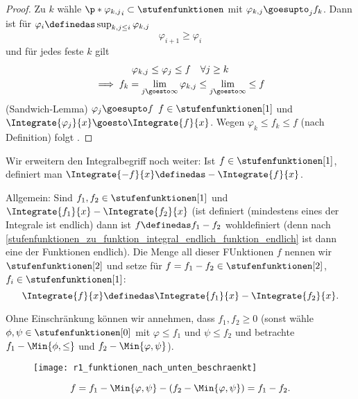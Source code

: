 \begin{proof}
  Zu \( k \) wähle \( \p*{\varphi_{k,j}}_i\subset \stufenfunktionen \) mit \( \varphi_{k,j}\goesupto_{j}f_k \). Dann ist für \( \varphi_i\definedas \sup_{k,j\leq i}\varphi_{k,j} \)
  \begin{equation*}
    \varphi_{i+1}\geq \varphi_i
  \end{equation*}
und für jedes feste \( k \) gilt
\begin{gather*}
  \varphi_{k,j}\leq \varphi_j\leq f \quad \forall j\geq k\\
  \implies f_k=\lim_{j \goesto \infty}\varphi_{k,j}\leq \lim_{j \goesto \infty}\leq f
\end{gather*}
\timplies (Sandwich-Lemma) \( \varphi_j\goesupto f \) \timplies \( f\in \stufenfunktionen[1] \) und \( \Integrate{\varphi_j}{x}\goesto \Integrate{f}{x} \). Wegen \( \varphi_k\leq f_k\leq f \) (nach Definition) folgt \Beh.
\end{proof}
\begin{bemdef}
  Wir erweitern den Integralbegriff noch weiter: Ist \( f\in \stufenfunktionen[1] \), definiert man \( \Integrate{-f}{x}\definedas -\Integrate{f}{x} \).

  Allgemein: Sind \( f_1,f_2\in \stufenfunktionen[1] \) und \( \Integrate{f_1}{x}-\Integrate{f_2}{x} \) (ist definiert (\dh mindestens eines der Integrale ist endlich) dann ist \( f\definedas f_1-f_2 \) wohldefiniert (denn nach \ref{stufenfunktionen_zu_funktion_integral_endlich_funktion_endlich} ist dann eine der Funktionen \fue endlich). Die Menge all dieser FUnktionen \( f \) nennen wir \( \stufenfunktionen[2] \) und setze für \( f=f_1-f_2\in \stufenfunktionen[2] \), \( f_i\in \stufenfunktionen[1] \):
  \begin{equation*}
    \Integrate{f}{x}\definedas \Integrate{f_1}{x}-\Integrate{f_2}{x}.
  \end{equation*}
\end{bemdef}
\begin{bemerkung*}
  Ohne Einschränkung können wir annehmen, dass \( f_1,f_2\geq 0 \) (sonst wähle \( \phi,\psi\in \stufenfunktionen[0] \) mit \( \varphi\leq f_1 \) und \( \psi\leq f_2 \) und betrachte \( f_1-\Min{\phi,\leq} \) und \( f_2-\Min{\varphi,\psi} \)).
  \begin{figure}[H]
    \centering
    \texttt{[image: r1\_funktionen\_nach\_unten\_beschraenkt]}
    \label{fig:r1_funktionen_nach_unten_beschraenkt}
  \end{figure}
  \begin{equation*}
    f=f_1-\Min{\varphi,\psi}-(f_2-\Min{\varphi,\psi})=f_1-f_2.
  \end{equation*}
\end{bemerkung*}
